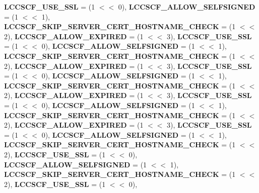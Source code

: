 \begin{DoxyCompactItemize}
{\bfseries L\+C\+C\+S\+C\+F\+\_\+\+U\+S\+E\+\_\+\+S\+SL} = (1 $<$$<$ 0), 
{\bfseries L\+C\+C\+S\+C\+F\+\_\+\+A\+L\+L\+O\+W\+\_\+\+S\+E\+L\+F\+S\+I\+G\+N\+ED} = (1 $<$$<$ 1), 
{\bfseries L\+C\+C\+S\+C\+F\+\_\+\+S\+K\+I\+P\+\_\+\+S\+E\+R\+V\+E\+R\+\_\+\+C\+E\+R\+T\+\_\+\+H\+O\+S\+T\+N\+A\+M\+E\+\_\+\+C\+H\+E\+CK} = (1 $<$$<$ 2), 
{\bfseries L\+C\+C\+S\+C\+F\+\_\+\+A\+L\+L\+O\+W\+\_\+\+E\+X\+P\+I\+R\+ED} = (1 $<$$<$ 3), 
\newline
{\bfseries L\+C\+C\+S\+C\+F\+\_\+\+U\+S\+E\+\_\+\+S\+SL} = (1 $<$$<$ 0), 
{\bfseries L\+C\+C\+S\+C\+F\+\_\+\+A\+L\+L\+O\+W\+\_\+\+S\+E\+L\+F\+S\+I\+G\+N\+ED} = (1 $<$$<$ 1), 
{\bfseries L\+C\+C\+S\+C\+F\+\_\+\+S\+K\+I\+P\+\_\+\+S\+E\+R\+V\+E\+R\+\_\+\+C\+E\+R\+T\+\_\+\+H\+O\+S\+T\+N\+A\+M\+E\+\_\+\+C\+H\+E\+CK} = (1 $<$$<$ 2), 
{\bfseries L\+C\+C\+S\+C\+F\+\_\+\+A\+L\+L\+O\+W\+\_\+\+E\+X\+P\+I\+R\+ED} = (1 $<$$<$ 3), 
\newline
{\bfseries L\+C\+C\+S\+C\+F\+\_\+\+U\+S\+E\+\_\+\+S\+SL} = (1 $<$$<$ 0), 
{\bfseries L\+C\+C\+S\+C\+F\+\_\+\+A\+L\+L\+O\+W\+\_\+\+S\+E\+L\+F\+S\+I\+G\+N\+ED} = (1 $<$$<$ 1), 
{\bfseries L\+C\+C\+S\+C\+F\+\_\+\+S\+K\+I\+P\+\_\+\+S\+E\+R\+V\+E\+R\+\_\+\+C\+E\+R\+T\+\_\+\+H\+O\+S\+T\+N\+A\+M\+E\+\_\+\+C\+H\+E\+CK} = (1 $<$$<$ 2), 
{\bfseries L\+C\+C\+S\+C\+F\+\_\+\+A\+L\+L\+O\+W\+\_\+\+E\+X\+P\+I\+R\+ED} = (1 $<$$<$ 3), 
\newline
{\bfseries L\+C\+C\+S\+C\+F\+\_\+\+U\+S\+E\+\_\+\+S\+SL} = (1 $<$$<$ 0), 
{\bfseries L\+C\+C\+S\+C\+F\+\_\+\+A\+L\+L\+O\+W\+\_\+\+S\+E\+L\+F\+S\+I\+G\+N\+ED} = (1 $<$$<$ 1), 
{\bfseries L\+C\+C\+S\+C\+F\+\_\+\+S\+K\+I\+P\+\_\+\+S\+E\+R\+V\+E\+R\+\_\+\+C\+E\+R\+T\+\_\+\+H\+O\+S\+T\+N\+A\+M\+E\+\_\+\+C\+H\+E\+CK} = (1 $<$$<$ 2), 
{\bfseries L\+C\+C\+S\+C\+F\+\_\+\+A\+L\+L\+O\+W\+\_\+\+E\+X\+P\+I\+R\+ED} = (1 $<$$<$ 3), 
\newline
{\bfseries L\+C\+C\+S\+C\+F\+\_\+\+U\+S\+E\+\_\+\+S\+SL} = (1 $<$$<$ 0), 
{\bfseries L\+C\+C\+S\+C\+F\+\_\+\+A\+L\+L\+O\+W\+\_\+\+S\+E\+L\+F\+S\+I\+G\+N\+ED} = (1 $<$$<$ 1), 
{\bfseries L\+C\+C\+S\+C\+F\+\_\+\+S\+K\+I\+P\+\_\+\+S\+E\+R\+V\+E\+R\+\_\+\+C\+E\+R\+T\+\_\+\+H\+O\+S\+T\+N\+A\+M\+E\+\_\+\+C\+H\+E\+CK} = (1 $<$$<$ 2), 
{\bfseries L\+C\+C\+S\+C\+F\+\_\+\+U\+S\+E\+\_\+\+S\+SL} = (1 $<$$<$ 0), 
\newline
{\bfseries L\+C\+C\+S\+C\+F\+\_\+\+A\+L\+L\+O\+W\+\_\+\+S\+E\+L\+F\+S\+I\+G\+N\+ED} = (1 $<$$<$ 1), 
{\bfseries L\+C\+C\+S\+C\+F\+\_\+\+S\+K\+I\+P\+\_\+\+S\+E\+R\+V\+E\+R\+\_\+\+C\+E\+R\+T\+\_\+\+H\+O\+S\+T\+N\+A\+M\+E\+\_\+\+C\+H\+E\+CK} = (1 $<$$<$ 2), 
{\bfseries L\+C\+C\+S\+C\+F\+\_\+\+U\+S\+E\+\_\+\+S\+SL} = (1 $<$$<$ 0), 
$$
\end{DoxyCompactItemize}
